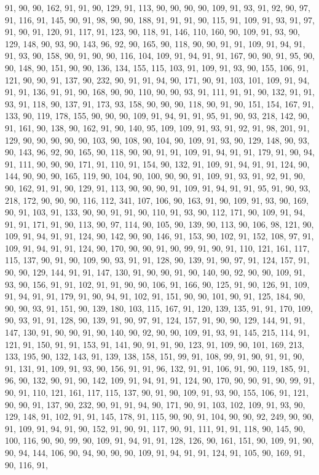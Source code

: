\begin{sloppypar}
91, 90, 90, 162, 91, 91, 90, 129, 91, 113, 90, 90, 90, 90, 109, 91, 93, 91, 92, 90, 97, 91, 116, 91, 145, 90, 91, 98, 90, 90, 188, 91, 91, 91, 90, 115, 91, 109, 91, 93, 91, 97, 91, 90, 91, 120, 91, 117, 91, 123, 90, 118, 91, 146, 110, 160, 90, 109, 91, 93, 90, 129, 148, 90, 93, 90, 143, 96, 92, 90, 165, 90, 118, 90, 90, 91, 91, 109, 91, 94, 91, 91, 93, 90, 158, 90, 91, 90, 90, 116, 104, 109, 91, 94, 91, 91, 167, 90, 90, 91, 95, 90, 90, 148, 90, 151, 90, 90, 136, 134, 155, 115, 103, 91, 109, 91, 93, 90, 155, 106, 91, 121, 90, 90, 91, 137, 90, 232, 90, 91, 91, 94, 90, 171, 90, 91, 103, 101, 109, 91, 94, 91, 91, 136, 91, 91, 90, 168, 90, 90, 110, 90, 90, 93, 91, 111, 91, 91, 90, 132, 91, 91, 93, 91, 118, 90, 137, 91, 173, 93, 158, 90, 90, 90, 118, 90, 91, 90, 151, 154, 167, 91, 133, 90, 119, 178, 155, 90, 90, 90, 109, 91, 94, 91, 91, 95, 91, 90, 93, 218, 142, 90, 91, 161, 90, 138, 90, 162, 91, 90, 140, 95, 109, 109, 91, 93, 91, 92, 91, 98, 201, 91, 129, 90, 90, 90, 90, 90, 103, 90, 108, 90, 104, 90, 109, 91, 93, 90, 129, 148, 90, 93, 90, 143, 96, 92, 90, 165, 90, 118, 90, 90, 91, 91, 109, 91, 94, 91, 91, 179, 91, 90, 94, 91, 111, 90, 90, 90, 171, 91, 110, 91, 154, 90, 132, 91, 109, 91, 94, 91, 91, 124, 90, 144, 90, 90, 90, 165, 119, 90, 104, 90, 100, 90, 90, 91, 109, 91, 93, 91, 92, 91, 90, 90, 162, 91, 91, 90, 129, 91, 113, 90, 90, 90, 91, 109, 91, 94, 91, 91, 95, 91, 90, 93, 218, 172, 90, 90, 90, 116, 112, 341, 107, 106, 90, 163, 91, 90, 109, 91, 93, 90, 169, 90, 91, 103, 91, 133, 90, 90, 91, 91, 90, 110, 91, 93, 90, 112, 171, 90, 109, 91, 94, 91, 91, 171, 91, 90, 113, 90, 97, 114, 90, 105, 90, 139, 90, 113, 90, 106, 98, 121, 90, 109, 91, 94, 91, 91, 124, 90, 142, 90, 90, 146, 91, 153, 90, 102, 91, 152, 108, 97, 91, 109, 91, 94, 91, 91, 124, 90, 170, 90, 90, 91, 90, 99, 91, 90, 91, 110, 121, 161, 117, 115, 137, 90, 91, 90, 109, 90, 93, 91, 91, 128, 90, 139, 91, 90, 97, 91, 124, 157, 91, 90, 90, 129, 144, 91, 91, 147, 130, 91, 90, 90, 91, 90, 140, 90, 92, 90, 90, 109, 91, 93, 90, 156, 91, 91, 102, 91, 91, 90, 90, 106, 91, 166, 90, 125, 91, 90, 126, 91, 109, 91, 94, 91, 91, 179, 91, 90, 94, 91, 102, 91, 151, 90, 90, 101, 90, 91, 125, 184, 90, 90, 90, 93, 91, 151, 90, 139, 180, 103, 115, 167, 91, 120, 139, 135, 91, 91, 170, 109, 90, 93, 91, 91, 128, 90, 139, 91, 90, 97, 91, 124, 157, 91, 90, 90, 129, 144, 91, 91, 147, 130, 91, 90, 90, 91, 90, 140, 90, 92, 90, 90, 109, 91, 93, 91, 145, 215, 114, 91, 121, 91, 150, 91, 91, 153, 91, 141, 90, 91, 91, 90, 123, 91, 109, 90, 101, 169, 213, 133, 195, 90, 132, 143, 91, 139, 138, 158, 151, 99, 91, 108, 99, 91, 90, 91, 91, 90, 91, 131, 91, 109, 91, 93, 90, 156, 91, 91, 96, 132, 91, 91, 106, 91, 90, 119, 185, 91, 96, 90, 132, 90, 91, 90, 142, 109, 91, 94, 91, 91, 124, 90, 170, 90, 90, 91, 90, 99, 91, 90, 91, 110, 121, 161, 117, 115, 137, 90, 91, 90, 109, 91, 93, 90, 155, 106, 91, 121, 90, 90, 91, 137, 90, 232, 90, 91, 91, 94, 90, 171, 90, 91, 103, 102, 109, 91, 93, 90, 129, 148, 91, 102, 91, 91, 145, 178, 91, 115, 90, 90, 91, 104, 90, 90, 92, 249, 90, 90, 91, 109, 91, 94, 91, 90, 152, 91, 90, 91, 117, 90, 91, 111, 91, 91, 118, 90, 145, 90, 100, 116, 90, 90, 99, 90, 109, 91, 94, 91, 91, 128, 126, 90, 161, 151, 90, 109, 91, 90, 90, 94, 144, 106, 90, 94, 90, 90, 90, 109, 91, 94, 91, 91, 124, 91, 105, 90, 169, 91, 90, 116, 91, 
\end{sloppypar}
